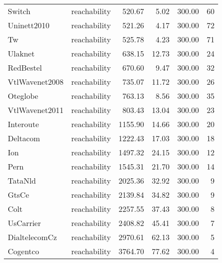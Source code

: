 \begin{tabular}{llrrrr}
Switch & reachability & 520.67 & 5.02 & 300.00 & 60 \\
Uninett2010 & reachability & 521.26 & 4.17 & 300.00 & 72 \\
Tw & reachability & 525.78 & 4.23 & 300.00 & 71 \\
Ulaknet & reachability & 638.15 & 12.73 & 300.00 & 24 \\
RedBestel & reachability & 670.60 & 9.47 & 300.00 & 32 \\
VtlWavenet2008 & reachability & 735.07 & 11.72 & 300.00 & 26 \\
Oteglobe & reachability & 763.13 & 8.56 & 300.00 & 35 \\
VtlWavenet2011 & reachability & 803.43 & 13.04 & 300.00 & 23 \\
Interoute & reachability & 1155.90 & 14.66 & 300.00 & 20 \\
Deltacom & reachability & 1222.43 & 17.03 & 300.00 & 18 \\
Ion & reachability & 1497.32 & 24.15 & 300.00 & 12 \\
Pern & reachability & 1545.31 & 21.70 & 300.00 & 14 \\
TataNld & reachability & 2025.36 & 32.92 & 300.00 & 9 \\
GtsCe & reachability & 2139.84 & 34.82 & 300.00 & 9 \\
Colt & reachability & 2257.55 & 37.43 & 300.00 & 8 \\
UsCarrier & reachability & 2408.82 & 45.41 & 300.00 & 7 \\
DialtelecomCz & reachability & 2970.61 & 62.13 & 300.00 & 5 \\
Cogentco & reachability & 3764.70 & 77.62 & 300.00 & 4 \\
\bottomrule
\end{tabular}
